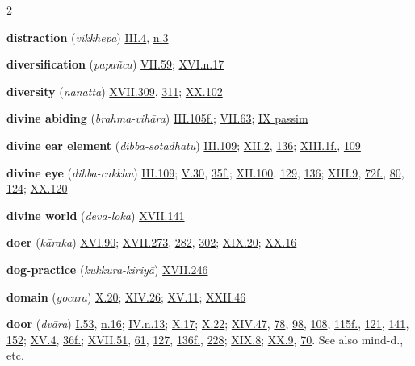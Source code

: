 \begin{multicols}{2}
\begin{vismHanging}
\par\textbf{distraction} (\emph{vikkhepa}) \hyperlink{III.4}{III.4}{}, \hyperlink{III.n3}{n.3}{}
\par\textbf{diversification} (\emph{papañca}) \hyperlink{VII.59}{VII.59}{}; \hyperlink{XVI.n17}{XVI.n.17}{}
\par\textbf{diversity} (\emph{nānatta}) \hyperlink{XVII.309}{XVII.309}{}, \hyperlink{XVII.311}{311}{}; \hyperlink{XX.102}{XX.102}{}
\par\textbf{divine abiding} (\emph{brahma-vihāra}) \hyperlink{III.105}{III.105f.}{}; \hyperlink{VII.63}{VII.63}{}; \hyperlink{IX}{IX passim}{}
\par\textbf{divine ear element} (\emph{dibba-sotadhātu}) \hyperlink{III.109}{III.109}{}; \hyperlink{XII.2}{XII.2}{}, \hyperlink{XII.136}{136}{}; \hyperlink{XIII.1}{XIII.1f.}{}, \hyperlink{XIII.109}{109}{}
\par\textbf{divine eye} (\emph{dibba-cakkhu}) \hyperlink{III.109}{III.109}{}; \hyperlink{V.30}{V.30}{}, \hyperlink{V.35}{35f.}{}; \hyperlink{XII.100}{XII.100}{}, \hyperlink{XII.129}{129}{}, \hyperlink{XII.136}{136}{}; \hyperlink{XIII.9}{XIII.9}{}, \hyperlink{XIII.72}{72f.}{}, \hyperlink{XIII.80}{80}{}, \hyperlink{XIII.124}{124}{}; \hyperlink{XX.120}{XX.120}{}
\par\textbf{divine world} (\emph{deva-loka}) \hyperlink{XVII.141}{XVII.141}{}
\par\textbf{doer} (\emph{kāraka}) \hyperlink{XVI.90}{XVI.90}{}; \hyperlink{XVII.273}{XVII.273}{}, \hyperlink{XVII.282}{282}{}, \hyperlink{XVII.302}{302}{}; \hyperlink{XIX.20}{XIX.20}{}; \hyperlink{XX.16}{XX.16}{}
\par\textbf{dog-practice} (\emph{kukkura-kiriyā}) \hyperlink{XVII.246}{XVII.246}{}
\par\textbf{domain} (\emph{gocara}) \hyperlink{X.20}{X.20}{}; \hyperlink{XIV.26}{XIV.26}{}; \hyperlink{XV.11}{XV.11}{}; \hyperlink{XXII.46}{XXII.46}{}
\par\textbf{door} (\emph{dvāra}) \hyperlink{I.53}{I.53}{}, \hyperlink{I.n16}{n.16}{}; \hyperlink{IV.n13}{IV.n.13}{}; \hyperlink{X.17}{X.17}{}; \hyperlink{X.22}{X.22}{}; \hyperlink{XIV.47}{XIV.47}{}, \hyperlink{XIV.78}{78}{}, \hyperlink{XIV.98}{98}{}, \hyperlink{XIV.108}{108}{}, \hyperlink{XIV.115}{115f.}{}, \hyperlink{XIV.121}{121}{}, \hyperlink{XIV.141}{141}{}, \hyperlink{XIV.152}{152}{}; \hyperlink{XV.4}{XV.4}{}, \hyperlink{XV.36}{36f.}{}; \hyperlink{XVII.51}{XVII.51}{}, \hyperlink{XVII.61}{61}{}, \hyperlink{XVII.127}{127}{}, \hyperlink{XVII.136}{136f.}{}, \hyperlink{XVII.228}{228}{}; \hyperlink{XIX.8}{XIX.8}{}; \hyperlink{XX.9}{XX.9}{}, \hyperlink{XX.70}{70}{}. See also mind-d., etc. 

\end{vismHanging}
\end{multicols}
